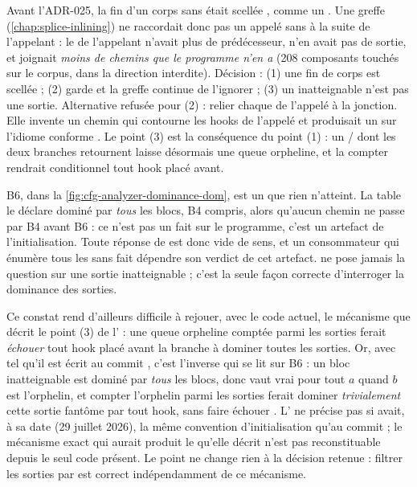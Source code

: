 \begin{decision}[ADR-025]
  Avant l'ADR-025, la fin d'un corps sans  était scellée
  , comme un . Une greffe (\cref{chap:splice-inlining})
  ne raccordait donc pas un appelé sans  à la suite de
  l'appelant : le  de l'appelant n'avait plus de prédécesseur,
   n'en avait pas de sortie, et  joignait
  \emph{moins de chemins que le programme n'en a} (208 composants touchés sur
  le corpus, dans la direction interdite). Décision : (1) une fin de corps
  est scellée  ; (2)  garde
   et la greffe continue de l'ignorer ; (3) un
   inatteignable n'est pas une sortie. Alternative refusée pour
  (2) : relier chaque  de l'appelé à la jonction. Elle
  invente un chemin qui contourne les hooks de l'appelé et produisait un
   \Error{} sur l'idiome conforme
  . Le point (3) est la
  conséquence du point (1) : un / dont les deux
  branches retournent laisse désormais une queue  orpheline, et
  la compter rendrait \og conditionnel\fg{} tout hook placé avant.
\end{decision}

\begin{piege}
  B6, dans la \cref{fig:cfg-analyzer-dominance-dom}, est un 
  que rien n'atteint. La table le déclare dominé par \emph{tous} les blocs,
  B4 compris, alors qu'aucun chemin ne passe par B4 avant B6 : ce n'est pas
  un fait sur le programme, c'est un artefact de l'initialisation. Toute
  réponse de  est donc vide de sens, et un
  consommateur qui énumère \og tous les \fg{} sans
   fait dépendre son verdict de cet artefact.
   ne pose jamais la question sur une sortie
  inatteignable ; c'est la seule façon correcte d'interroger la dominance
  des sorties.

  Ce constat rend d'ailleurs difficile à rejouer, avec le code actuel, le
  mécanisme que décrit le point (3) de l' : une queue 
  orpheline comptée parmi les sorties ferait \emph{échouer} tout hook placé
  avant la branche à \og dominer toutes les sorties\fg. Or, avec
   tel qu'il est écrit au commit \snapshotCommit,
  c'est l'inverse qui se lit sur B6 : un bloc inatteignable est dominé par
  \emph{tous} les blocs, donc  vaut vrai pour tout $a$
  quand $b$ est l'orphelin, et compter l'orphelin parmi les sorties ferait
  dominer \emph{trivialement} cette sortie fantôme par tout hook, sans faire
  échouer . L' ne précise pas si
   avait, à sa date (29 juillet 2026), la même
  convention d'initialisation qu'au commit \snapshotCommit{} ; le mécanisme
  exact qui aurait produit le  \Error{} qu'elle
  décrit n'est pas reconstituable depuis le seul code présent. Le point ne
  change rien à la décision retenue : filtrer les sorties par
   est correct indépendamment de ce mécanisme.
\end{piege}

